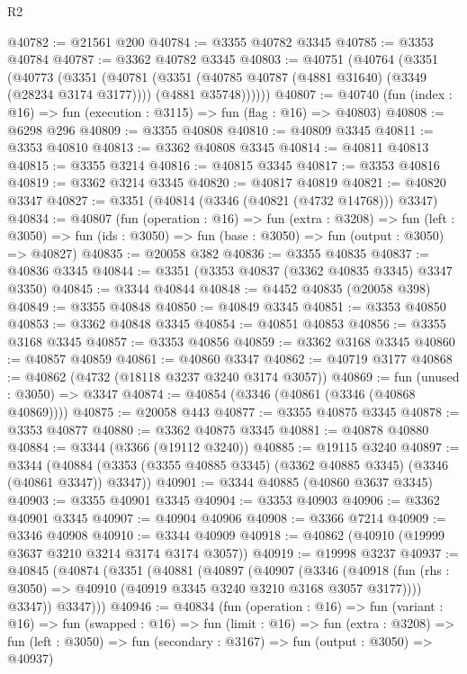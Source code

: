 \begin{lexlean}{R2}
\begin{coremodule}
@40782 := @21561 @200
@40784 := @3355 @40782 @3345
@40785 := @3353 @40784
@40787 := @3362 @40782 @3345
@40803 := @40751
    (@40764
      (@3351
        (@40773
          (@3351
            (@40781
              (@3351 (@40785 @40787 (@4881 @31640) (@3349 (@28234 @3174 @3177))))
              (@4881 @35748))))))
@40807 := @40740 (fun (index : @16) => fun (execution : @3115) => fun (flag : @16) => @40803)
@40808 := @6298 @296
@40809 := @3355 @40808
@40810 := @40809 @3345
@40811 := @3353 @40810
@40813 := @3362 @40808 @3345
@40814 := @40811 @40813
@40815 := @3355 @3214
@40816 := @40815 @3345
@40817 := @3353 @40816
@40819 := @3362 @3214 @3345
@40820 := @40817 @40819
@40821 := @40820 @3347
@40827 := @3351 (@40814 (@3346 (@40821 (@4732 @14768))) @3347)
@40834 := @40807
    (fun (operation : @16) =>
    fun (extra : @3208) =>
    fun (left : @3050) => fun (ids : @3050) => fun (base : @3050) => fun (output : @3050) => @40827)
@40835 := @20058 @382
@40836 := @3355 @40835
@40837 := @40836 @3345
@40844 := @3351 (@3353 @40837 (@3362 @40835 @3345) @3347 @3350)
@40845 := @3344 @40844
@40848 := @4452 @40835 (@20058 @398)
@40849 := @3355 @40848
@40850 := @40849 @3345
@40851 := @3353 @40850
@40853 := @3362 @40848 @3345
@40854 := @40851 @40853
@40856 := @3355 @3168 @3345
@40857 := @3353 @40856
@40859 := @3362 @3168 @3345
@40860 := @40857 @40859
@40861 := @40860 @3347
@40862 := @40719 @3177
@40868 := @40862 (@4732 (@18118 @3237 @3240 @3174 @3057))
@40869 := fun (unused : @3050) => @3347
@40874 := @40854 (@3346 (@40861 (@3346 (@40868 @40869))))
@40875 := @20058 @443
@40877 := @3355 @40875 @3345
@40878 := @3353 @40877
@40880 := @3362 @40875 @3345
@40881 := @40878 @40880
@40884 := @3344 (@3366 (@19112 @3240))
@40885 := @19115 @3240
@40897 := @3344
    (@40884 (@3353 (@3355 @40885 @3345) (@3362 @40885 @3345) (@3346 (@40861 @3347)) @3347))
@40901 := @3344 @40885 (@40860 @3637 @3345)
@40903 := @3355 @40901 @3345
@40904 := @3353 @40903
@40906 := @3362 @40901 @3345
@40907 := @40904 @40906
@40908 := @3366 @7214
@40909 := @3346 @40908
@40910 := @3344 @40909
@40918 := @40862 (@40910 (@19999 @3637 @3210 @3214 @3174 @3174 @3057))
@40919 := @19998 @3237
@40937 := @40845
    (@40874
      (@3351
        (@40881
          (@40897
            (@40907
              (@3346
                (@40918 (fun (rhs : @3050) => @40910 (@40919 @3345 @3240 @3210 @3168 @3057 @3177))))
              @3347))
          @3347)))
@40946 := @40834
    (fun (operation : @16) =>
    fun (variant : @16) =>
    fun (swapped : @16) =>
    fun (limit : @16) =>
    fun (extra : @3208) =>
    fun (left : @3050) => fun (secondary : @3167) => fun (output : @3050) => @40937)

\end{coremodule}
\end{lexlean}
